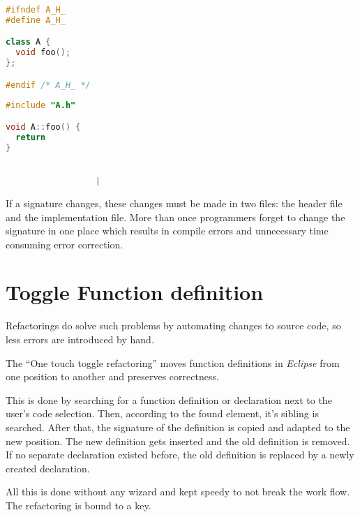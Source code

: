 \vspace{0.5cm}
\begin{minipage}{.468\textwidth}
\lstset{xrightmargin=0.55cm}
\begin{lstlisting}[caption={Header file with a\newline declaration},
label={twofile1}, language=C++]
#ifndef A_H_
#define A_H_

class A {
  void foo();
};

#endif /* A_H_ */
\end{lstlisting}
\end{minipage}%
\begin{minipage}{.492\textwidth}
\lstset{xleftmargin=0.55cm}
\begin{lstlisting}[caption={Source file containing definition},
label={twofile2}, language=C++ ]
#include "A.h"

void A::foo() {
  return
}


	              |
\end{lstlisting}
\end{minipage}

If a signature changes, these changes must be made in two files: the header file
and the implementation file. More than once programmers forget to change the
signature in one place which results in compile errors and unnecessary time
consuming error correction.

\section*{Toggle Function definition}

Refactorings do solve such problems by automating changes to source code, so
less errors are introduced by hand.

The ``One touch toggle refactoring'' moves function definitions in
\textit{Eclipse} from one position to another and preserves correctness.

This is done by searching for a function definition or declaration next to the
user's code selection. Then, according to the found
element, it's sibling is searched. After that, the signature of the definition is
copied and adapted to the new position. The new definition gets inserted and
the old definition is removed.
If no separate declaration existed before, the old definition is replaced by a 
newly created declaration.

All this is done without any wizard and kept speedy to not break the work flow.
The refactoring is bound to a key.

